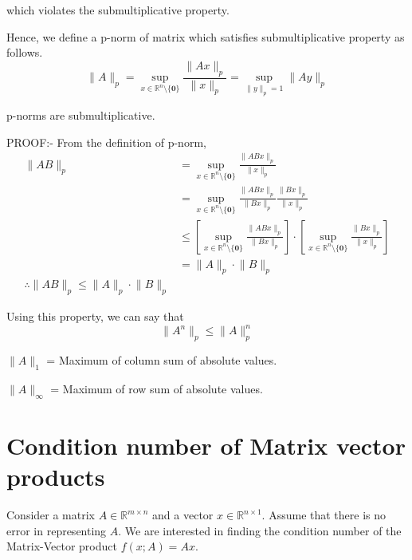 \documentclass[
]{book}
\begin{document}
which violates the submultiplicative property.

Hence, we define a p-norm of matrix which satisfies submultiplicative property as follows.
\begin{equation}
\lVert A \rVert_p = \sup_{x\in\mathbb{R}^{n}\setminus \{ \mathbf{0} \}} \frac{\lVert Ax \rVert_p}{\lVert x \rVert_p} = \sup_{\lVert y \rVert_p = 1} \lVert Ay \rVert_p
\end{equation}

p-norms are submultiplicative.

PROOF:- From the definition of p-norm,
\begin{align*}
\lVert AB \rVert_p &= \sup_{x\in\mathbb{R}^{n}\setminus \{ \mathbf{0} \}} \frac{\lVert ABx \rVert_p}{\lVert x \rVert_p}\\
&= \sup_{x\in\mathbb{R}^{n}\setminus \{ \mathbf{0} \}} \frac{\lVert ABx \rVert_p}{\lVert Bx \rVert_p} \frac{\lVert Bx \rVert_p}{\lVert x \rVert_p} \\
&\le \left[\sup_{x\in\mathbb{R}^{n}\setminus \{ \mathbf{0} \}} \frac{\lVert ABx \rVert_p}{\lVert Bx \rVert_p} \right] \cdot \left[ \sup_{x\in\mathbb{R}^{n}\setminus \{ \mathbf{0} \}} \frac{\lVert Bx \rVert_p}{\lVert x \rVert_p} \right]  \\
&= \lVert A \rVert_p \cdot \lVert B \rVert_p\\
\therefore \lVert AB \rVert_p \le \lVert A \rVert_p \cdot \lVert B \rVert_p
\end{align*}

Using this property, we can say that
\begin{equation}
 \lVert A^n \rVert_p \le \lVert A \rVert^n_p
\end{equation}

\(\lVert A\rVert_1\) = Maximum of column sum of absolute values.

\(\lVert A\rVert_{\infty}\) = Maximum of row sum of absolute values.

\hypertarget{condition-number-of-matrix-vector-products}{%
\section{Condition number of Matrix vector products}\label{condition-number-of-matrix-vector-products}}

Consider a matrix \(A\in\mathbb{R}^{m\times n}\) and a vector \(x\in\mathbb{R}^{n\times 1}\). Assume that there is no error in representing \(A\). We are interested in finding the condition number of the Matrix-Vector product \(f(x;A)= Ax\).
\end{document}
